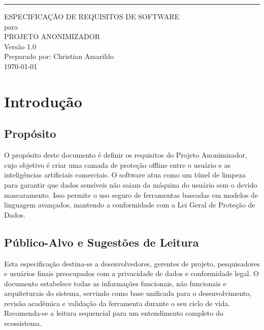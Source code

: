\documentclass{scrreprt}
\date{}
\def\myversion{1.0 }
\begin{document}
\begin{flushright}
    \rule{16cm}{5pt}\vskip1cm
    \begin{bfseries}
        \Huge{ESPECIFICAÇÃO DE REQUISITOS DE SOFTWARE}\\
        \vspace{1.5cm}
        para\\
        \vspace{1.5cm}
        PROJETO ANONIMIZADOR\\
        \vspace{1.5cm}
        \LARGE{Versão \myversion}\\
        \vspace{1.5cm}
        Preparado por: Christian Amarildo\\
        \vspace{1.5cm}
        \today\\
    \end{bfseries}
\end{flushright}

\tableofcontents

\chapter{Introdução}

\section{Propósito}
O propósito deste documento é definir os requisitos do Projeto Anonimizador, cujo objetivo é criar uma camada de proteção offline entre o usuário e as inteligências artificiais comerciais. O software atua como um túnel de limpeza para garantir que dados sensíveis não saiam da máquina do usuário sem o devido mascaramento. Isso permite o uso seguro de ferramentas baseadas em modelos de linguagem avançados, mantendo a conformidade com a Lei Geral de Proteção de Dados.

\section{Público-Alvo e Sugestões de Leitura}
Esta especificação destina-se a desenvolvedores, gerentes de projeto, pesquisadores e usuários finais preocupados com a privacidade de dados e conformidade legal. O documento estabelece todas as informações funcionais, não funcionais e arquiteturais do sistema, servindo como base unificada para o desenvolvimento, revisão acadêmica e validação da ferramenta durante o seu ciclo de vida. Recomenda-se a leitura sequencial para um entendimento completo do ecossistema.
\end{document}
